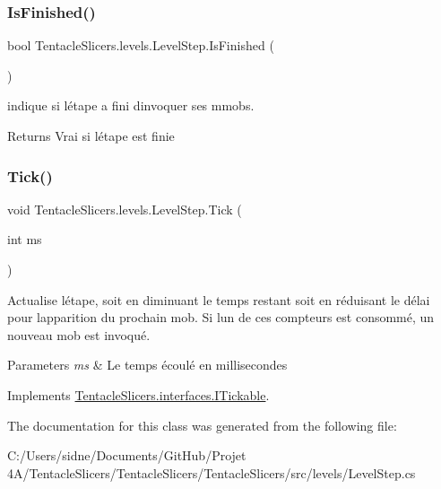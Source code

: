 \subsubsection{\texorpdfstring{Is\+Finished()}{IsFinished()}}
{\footnotesize\ttfamily bool Tentacle\+Slicers.\+levels.\+Level\+Step.\+Is\+Finished (\begin{DoxyParamCaption}{ }\end{DoxyParamCaption})}



indique si l\textquotesingle{}étape a fini d\textquotesingle{}invoquer ses mmobs. 

\begin{DoxyReturn}{Returns}
Vrai si l\textquotesingle{}étape est finie 
\end{DoxyReturn}
\mbox{\label{class_tentacle_slicers_1_1levels_1_1_level_step_a5f8a74eeee5fbc7bf29ea4ed2a065037}} 
\subsubsection{\texorpdfstring{Tick()}{Tick()}}
{\footnotesize\ttfamily void Tentacle\+Slicers.\+levels.\+Level\+Step.\+Tick (\begin{DoxyParamCaption}\item[{int}]{ms }\end{DoxyParamCaption})}



Actualise l\textquotesingle{}étape, soit en diminuant le temps restant soit en réduisant le délai pour l\textquotesingle{}apparition du prochain mob. Si l\textquotesingle{}un de ces compteurs est consommé, un nouveau mob est invoqué. 


\begin{DoxyParams}{Parameters}
{\em ms} & Le temps écoulé en millisecondes \\
\hline
\end{DoxyParams}


Implements \hyperlink{interface_tentacle_slicers_1_1interfaces_1_1_i_tickable}{Tentacle\+Slicers.\+interfaces.\+I\+Tickable}.



The documentation for this class was generated from the following file\+:\begin{DoxyCompactItemize}
\item 
C\+:/\+Users/sidne/\+Documents/\+Git\+Hub/\+Projet 4\+A/\+Tentacle\+Slicers/\+Tentacle\+Slicers/\+Tentacle\+Slicers/src/levels/Level\+Step.\+cs\end{DoxyCompactItemize}
